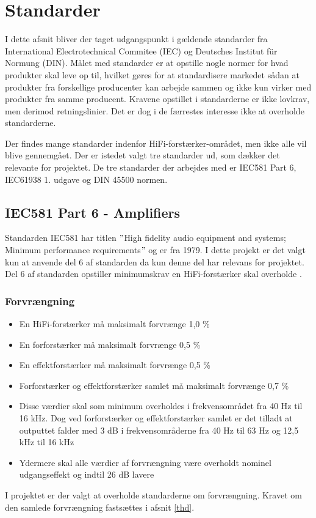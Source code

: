 \section{Standarder}
\label{standarder}
I dette afsnit bliver der taget udgangspunkt i gældende standarder fra International Electrotechnical Commitee (IEC) og Deutsches Institut f\"{u}r Normung (DIN). Målet med standarder er at opstille nogle normer for hvad produkter skal leve op til, hvilket gøres for at standardisere markedet sådan at produkter fra forskellige producenter kan arbejde sammen og ikke kun virker med produkter fra samme producent. Kravene opstillet i standarderne er ikke lovkrav, men derimod retningslinier. Det er dog i de færrestes interesse ikke at overholde standarderne.

Der findes mange standarder indenfor HiFi-forstærker-området, men ikke alle vil blive gennemgået. Der er istedet valgt tre standarder ud, som dækker det relevante for projektet. De tre standarder der arbejdes med er IEC581 Part 6, IEC61938 1. udgave og DIN 45500 normen. 

\subsection*{IEC581 Part 6 - Amplifiers}
\label{IEC581}
Standarden IEC581 har titlen $"$High fidelity audio equipment and systems; Minimum performance requirements$"$ og er fra 1979. I dette projekt er det valgt kun at anvende del 6 af standarden da kun denne del har relevans for projektet. Del 6 af standarden opstiller minimumskrav en HiFi-forstærker skal overholde \cite{IEC581-6}.

\subsubsection*{Forvrængning}

\begin{itemize}
\item En HiFi-forstærker må maksimalt forvrænge 1,0 \%
\item En forforstærker må maksimalt forvrænge 0,5 \%
\item En effektforstærker må maksimalt forvrænge 0,5 \%
\item Forforstærker og effektforstærker samlet må maksimalt forvrænge 0,7 \%
\item Disse værdier skal som minimum overholdes i frekvensområdet fra 40 Hz til 16 kHz. Dog ved forforstærker og effektforstærker samlet er det tilladt at outputtet falder med 3 dB i frekvensområderne fra 40 Hz til 63 Hz og 12,5 kHz til 16 kHz
\item Ydermere skal alle værdier af forvrængning være overholdt nominel udgangseffekt og indtil 26 dB lavere 
\end{itemize}
I projektet er der valgt at overholde standarderne om forvrængning. Kravet om den samlede forvrængning fastsættes i afsnit \ref{thd}. 

